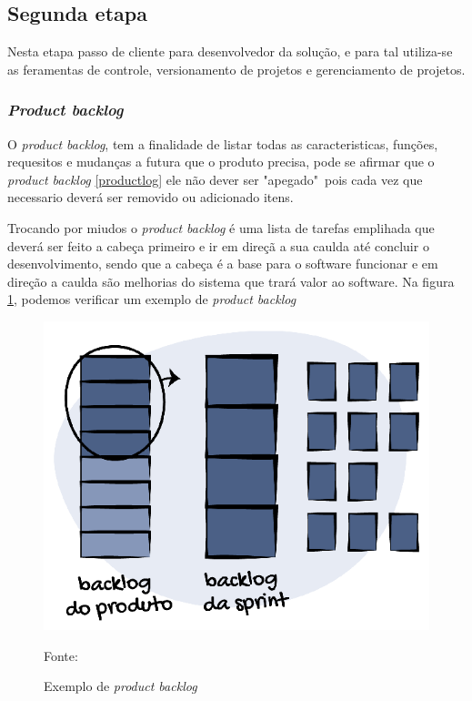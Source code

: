 \subsection{Segunda etapa}
\par Nesta etapa passo de cliente para desenvolvedor da solução, e para tal utiliza-se as feramentas de controle, versionamento de projetos e gerenciamento de projetos.


\subsubsection{\textit{Product backlog}}
\par O \textit{product backlog}, tem a finalidade de listar todas as caracteristicas, funções, requesitos e mudanças a futura que o produto precisa, pode se afirmar que o \textit{product backlog} \ref{productlog} ele não dever ser "apegado"\ pois cada vez que necessario deverá ser removido ou adicionado itens.
\par Trocando por miudos o \textit{product backlog} é uma lista de tarefas emplihada que deverá ser feito a cabeça primeiro e ir em direçã a sua caulda até concluir o desenvolvimento, sendo que a cabeça é a base para o software funcionar e em direção a caulda são melhorias do sistema que trará valor ao software. Na figura \ref{priorizacao-backlog}, podemos verificar um exemplo de \textit{product backlog}
\begin{figure}[H] %
  \center
  \caption{Exemplo de \textit{product backlog}}

  \includegraphics[width=\textwidth]{figure/priorizacao-backlog.png}

  \raggedright
  {\fontsize{10pt}{\baselineskip}\selectfont Fonte: }
  \label{priorizacao-backlog}
\end{figure}


